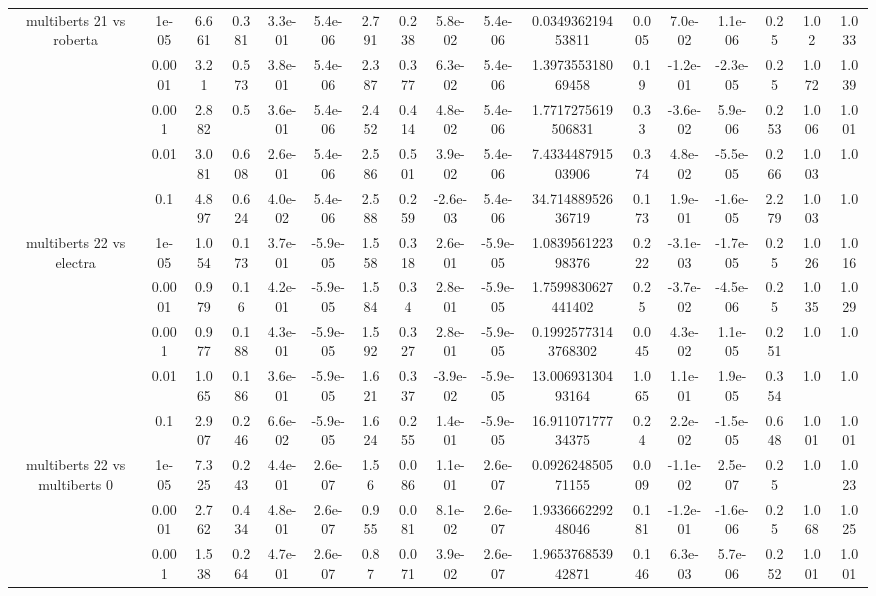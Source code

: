\begin{tabular}{|c|c|c|c|c|c|c|c|c|c|c|c|c|c|c|c|c|}
\hline
\multirow{5}{*}{multiberts 21 vs roberta } & 1e-05 & 6.661 & 0.381 & 3.3e-01 & 5.4e-06 & 2.791 & 0.238 & 5.8e-02 & 5.4e-06 & 0.034936219453811 & 0.005 & 7.0e-02 & 1.1e-06 & 0.25 & 1.02 & 1.033 \\
 & 0.0001 & 3.21 & 0.573 & 3.8e-01 & 5.4e-06 & 2.387 & 0.377 & 6.3e-02 & 5.4e-06 & 1.397355318069458 & 0.19 & -1.2e-01 & -2.3e-05 & 0.25 & 1.072 & 1.039 \\
 & 0.001 & 2.882 & 0.5 & 3.6e-01 & 5.4e-06 & 2.452 & 0.414 & 4.8e-02 & 5.4e-06 & 1.7717275619506831 & 0.33 & -3.6e-02 & 5.9e-06 & 0.253 & 1.006 & 1.001 \\
 & 0.01 & 3.081 & 0.608 & 2.6e-01 & 5.4e-06 & 2.586 & 0.501 & 3.9e-02 & 5.4e-06 & 7.433448791503906 & 0.374 & 4.8e-02 & -5.5e-05 & 0.266 & 1.003 & 1.0 \\
 & 0.1 & 4.897 & 0.624 & 4.0e-02 & 5.4e-06 & 2.588 & 0.259 & -2.6e-03 & 5.4e-06 & 34.71488952636719 & 0.173 & 1.9e-01 & -1.6e-05 & 2.279 & 1.003 & 1.0 \\
\hline
\multirow{5}{*}{multiberts 22 vs electra } & 1e-05 & 1.054 & 0.173 & 3.7e-01 & -5.9e-05 & 1.558 & 0.318 & 2.6e-01 & -5.9e-05 & 1.083956122398376 & 0.222 & -3.1e-03 & -1.7e-05 & 0.25 & 1.026 & 1.016 \\
 & 0.0001 & 0.979 & 0.16 & 4.2e-01 & -5.9e-05 & 1.584 & 0.34 & 2.8e-01 & -5.9e-05 & 1.7599830627441402 & 0.25 & -3.7e-02 & -4.5e-06 & 0.25 & 1.035 & 1.029 \\
 & 0.001 & 0.977 & 0.188 & 4.3e-01 & -5.9e-05 & 1.592 & 0.327 & 2.8e-01 & -5.9e-05 & 0.19925773143768302 & 0.045 & 4.3e-02 & 1.1e-05 & 0.251 & 1.0 & 1.0 \\
 & 0.01 & 1.065 & 0.186 & 3.6e-01 & -5.9e-05 & 1.621 & 0.337 & -3.9e-02 & -5.9e-05 & 13.00693130493164 & 1.065 & 1.1e-01 & 1.9e-05 & 0.354 & 1.0 & 1.0 \\
 & 0.1 & 2.907 & 0.246 & 6.6e-02 & -5.9e-05 & 1.624 & 0.255 & 1.4e-01 & -5.9e-05 & 16.91107177734375 & 0.24 & 2.2e-02 & -1.5e-05 & 0.648 & 1.001 & 1.001 \\
\hline
\multirow{5}{*}{multiberts 22 vs multiberts 0} & 1e-05 & 7.325 & 0.243 & 4.4e-01 & 2.6e-07 & 1.56 & 0.086 & 1.1e-01 & 2.6e-07 & 0.092624850571155 & 0.009 & -1.1e-02 & 2.5e-07 & 0.25 & 1.0 & 1.023 \\
 & 0.0001 & 2.762 & 0.434 & 4.8e-01 & 2.6e-07 & 0.955 & 0.081 & 8.1e-02 & 2.6e-07 & 1.933666229248046 & 0.181 & -1.2e-01 & -1.6e-06 & 0.25 & 1.068 & 1.025 \\
 & 0.001 & 1.538 & 0.264 & 4.7e-01 & 2.6e-07 & 0.87 & 0.071 & 3.9e-02 & 2.6e-07 & 1.965376853942871 & 0.146 & 6.3e-03 & 5.7e-06 & 0.252 & 1.001 & 1.001 \\

\end{tabular}
